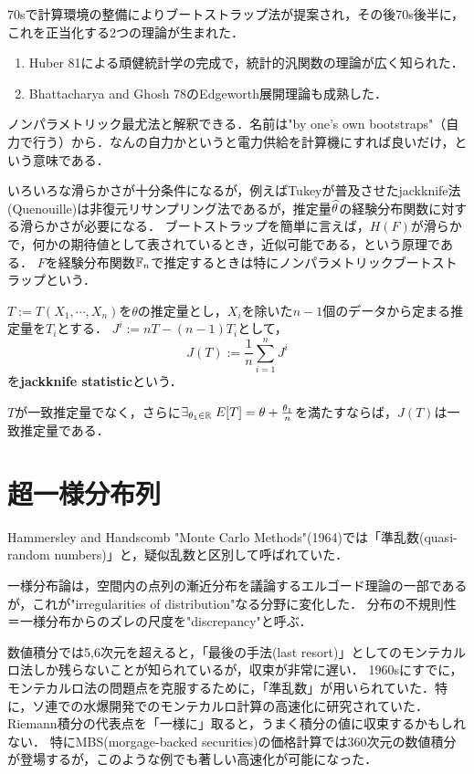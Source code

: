 \documentclass[uplatex,dvipdfmx]{jsreport}
\begin{document}
\begin{history}[Bootstrapの正当化]
    70sで計算環境の整備によりブートストラップ法が提案され，その後70s後半に，これを正当化する2つの理論が生まれた．
    \begin{enumerate}
        \item Huber 81による頑健統計学の完成で，統計的汎関数の理論が広く知られた．
        \item Bhattacharya and Ghosh 78のEdgeworth展開理論も成熟した．
    \end{enumerate}
    ノンパラメトリック最尤法と解釈できる．名前は"by one's own bootstraps"（自力で行う）から．なんの自力かというと電力供給を計算機にすれば良いだけ，という意味である．
\end{history}

\begin{discussion}
    いろいろな滑らかさが十分条件になるが，例えばTukeyが普及させたjackknife法(Quenouille)は非復元リサンプリング法であるが，推定量$\widehat{\theta}$の経験分布関数に対する滑らかさが必要になる．
    ブートストラップを簡単に言えば，$H(F)$が滑らかで，何かの期待値として表されているとき，近似可能である，という原理である．
    $F$を経験分布関数$\mathbb{F}_n$で推定するときは特にノンパラメトリックブートストラップという．
\end{discussion}

\begin{definition}
    $T:=T(X_1,\cdots,X_n)$を$\theta$の推定量とし，$X_i$を除いた$n-1$個のデータから定まる推定量を$T_i$とする．
    $J^i:=nT-(n-1)T_i$として，
    \[J(T):=\frac{1}{n}\sum_{i=1}^nJ^i\]
    を\textbf{jackknife statistic}という．
\end{definition}

\begin{theorem}
    $T$が一致推定量でなく，さらに$\exists_{\theta_1\in\mathbb{R}}\;E[T]=\theta+\frac{\theta_1}{n}$を満たすならば，$J(T)$は一致推定量である．
\end{theorem}

\section{超一様分布列}

\begin{history}
    Hammersley and Handscomb "Monte Carlo Methods"(1964)では「準乱数(quasi-random numbers)」と，疑似乱数と区別して呼ばれていた．

    一様分布論は，空間内の点列の漸近分布を議論するエルゴード理論の一部であるが，これが"irregularities of distribution"なる分野に変化した．
    分布の不規則性＝一様分布からのズレの尺度を"discrepancy"と呼ぶ．

    数値積分では5,6次元を超えると，「最後の手法(last resort)」としてのモンテカルロ法しか残らないことが知られているが，収束が非常に遅い．
    1960sにすでに，モンテカルロ法の問題点を克服するために，「準乱数」が用いられていた．特に，ソ連での水爆開発でのモンテカルロ計算の高速化に研究されていた．
    Riemann積分の代表点を「一様に」取ると，うまく積分の値に収束するかもしれない．
    特にMBS(morgage-backed securities)の価格計算では360次元の数値積分が登場するが，このような例でも著しい高速化が可能になった．
\end{history}
\end{document}
